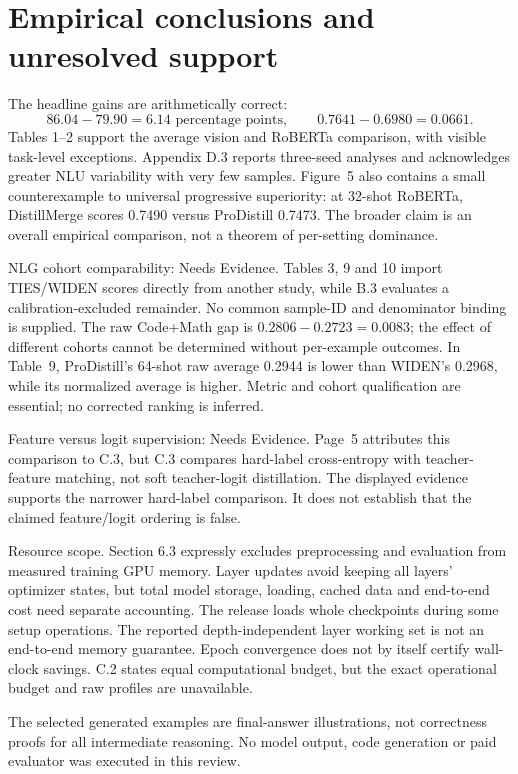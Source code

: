 \documentclass[10pt]{article}
\begin{document}
\section*{Empirical conclusions and unresolved support}
The headline gains are arithmetically correct: \[86.04-79.90=6.14\text{ percentage points},\qquad
 0.7641-0.6980=0.0661.\] Tables 1–2 support the average vision and RoBERTa comparison, with visible task-level exceptions. Appendix D.3 reports three-seed analyses and acknowledges greater NLU variability with very few samples. Figure 5 also contains a small counterexample to universal progressive superiority: at 32-shot RoBERTa, DistillMerge scores 0.7490 versus ProDistill 0.7473. The broader claim is an overall empirical comparison, not a theorem of per-setting dominance.\par
NLG cohort comparability: Needs Evidence. Tables 3, 9 and 10 import TIES/WIDEN scores directly from another study, while B.3 evaluates a calibration-excluded remainder. No common sample-ID and denominator binding is supplied. The raw Code+Math gap is \(0.2806-0.2723=0.0083\); the effect of different cohorts cannot be determined without per-example outcomes. In Table 9, ProDistill’s 64-shot raw average 0.2944 is lower than WIDEN’s 0.2968, while its normalized average is higher. Metric and cohort qualification are essential; no corrected ranking is inferred.\par
Feature versus logit supervision: Needs Evidence. Page 5 attributes this comparison to C.3, but C.3 compares hard-label cross-entropy with teacher-feature matching, not soft teacher-logit distillation. The displayed evidence supports the narrower hard-label comparison. It does not establish that the claimed feature/logit ordering is false.\par
Resource scope. Section 6.3 expressly excludes preprocessing and evaluation from measured training GPU memory. Layer updates avoid keeping all layers’ optimizer states, but total model storage, loading, cached data and end-to-end cost need separate accounting. The release loads whole checkpoints during some setup operations. The reported depth-independent layer working set is not an end-to-end memory guarantee. Epoch convergence does not by itself certify wall-clock savings. C.2 states equal computational budget, but the exact operational budget and raw profiles are unavailable.\par
The selected generated examples are final-answer illustrations, not correctness proofs for all intermediate reasoning. No model output, code generation or paid evaluator was executed in this review.\par
\end{document}

